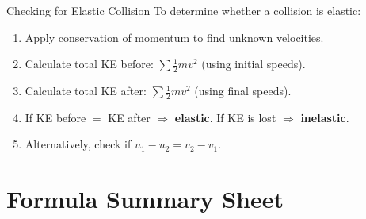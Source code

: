 \begin{keybox}{Checking for Elastic Collision}
To determine whether a collision is elastic:
\begin{enumerate}[itemsep=2pt]
  \item Apply conservation of momentum to find unknown velocities.
  \item Calculate total KE before: $\sum \tfrac{1}{2}mv^2$ (using initial speeds).
  \item Calculate total KE after: $\sum \tfrac{1}{2}mv^2$ (using final speeds).
  \item If KE before $=$ KE after $\Rightarrow$ \textbf{elastic}. If KE is lost $\Rightarrow$ \textbf{inelastic}.
  \item Alternatively, check if $u_1 - u_2 = v_2 - v_1$.
\end{enumerate}
\end{keybox}

\section{Formula Summary Sheet}

